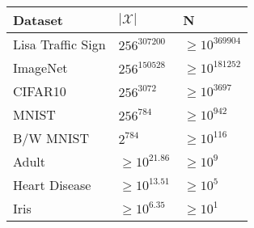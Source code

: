 \begin{tabular}{lll}
\toprule
Dataset & $|\mathcal{X}|$ & N \\
\midrule
Lisa Traffic Sign & $256^{307200}$ & $ \ge 10^{369904}$ \\
ImageNet & $256^{150528}$ & $ \ge 10^{181252}$ \\
CIFAR10 & $256^{3072}$ & $ \ge 10^{3697}$ \\
MNIST & $256^{784}$ & $ \ge 10^{942}$ \\
B/W MNIST & $2^{784}$ & $ \ge 10^{116}$ \\
Adult & $\ge 10^{21.86}$ & $ \ge 10^{9}$ \\
Heart Disease & $\ge 10^{13.51}$ & $ \ge 10^{5}$ \\
Iris & $\ge 10^{6.35}$ & $ \ge 10^{1}$ \\
\bottomrule
\end{tabular}
